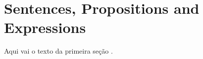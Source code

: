 \section{Sentences, Propositions and Expressions}

Aqui vai o texto da primeira seção \cite{exemplochapter1sec1} \cite{artigo2024chapter1sec1}.

\printbibliography[heading=subbibliography, title={Referências da Seção 1.1}, keyword=chapter1secao1]